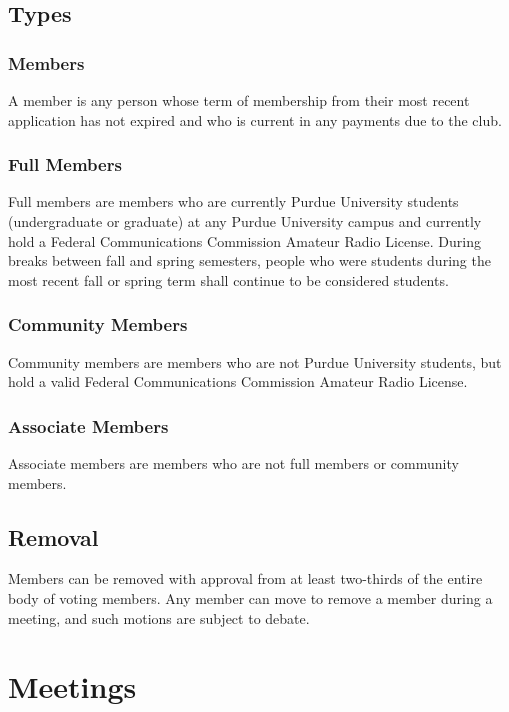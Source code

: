 \documentclass{article}
\begin{document}
\subsection{Types}

\subsubsection{Members}

A member is any person whose term of membership from their most recent
application has not expired and who is current in any payments due to the club.

\subsubsection{Full Members}

Full members are members who are currently Purdue University students
(undergraduate or graduate) at any Purdue University campus and currently hold a
Federal Communications Commission Amateur Radio License. During breaks between
fall and spring semesters, people who were students during the most recent fall
or spring term shall continue to be considered students.

\subsubsection{Community Members}

Community members are members who are not Purdue University students, but hold a
valid Federal Communications Commission Amateur Radio License.

\subsubsection{Associate Members}

Associate members are members who are not full members or community members.

\subsection{Removal}

Members can be removed with approval from at least two-thirds of the entire body
of voting members. Any member can move to remove a member during a meeting, and
such motions are subject to debate.

\section{Meetings}
\end{document}
